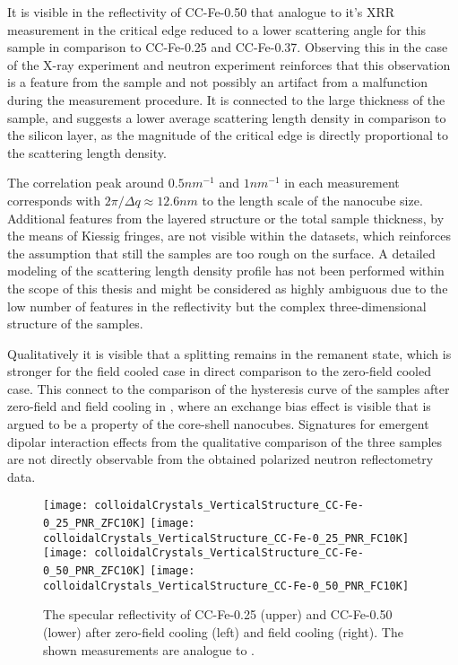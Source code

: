 \documentclass[\main/dresen_thesis.tex]{subfiles}
\begin{document}
  It is visible in the reflectivity of CC-Fe-0.50 that analogue to it's XRR measurement in  the critical edge reduced to a lower scattering angle for this sample in comparison to CC-Fe-0.25 and CC-Fe-0.37.
  Observing this in the case of the X-ray experiment and neutron experiment reinforces that this observation is a feature from the sample and not possibly an artifact from a malfunction during the measurement procedure.
  It is connected to the large thickness of the sample, and suggests a lower average scattering length density in comparison to the silicon layer, as the magnitude of the critical edge is directly proportional to the scattering length density.

  The correlation peak around $0.5 \unit{nm^{-1}}$ and $1 \unit{nm^{-1}}$ in each measurement corresponds with $2 \pi / \Delta q \approx 12.6 \unit{nm}$ to the length scale of the nanocube size.
  Additional features from the layered structure or the total sample thickness, by the means of Kiessig fringes, are not visible within the datasets, which reinforces the assumption that still the samples are too rough on the surface.
  A detailed modeling of the scattering length density profile has not been performed within the scope of this thesis and might be considered as highly ambiguous due to the low number of features in the reflectivity but the complex three-dimensional structure of the samples.

  Qualitatively it is visible that a splitting remains in the remanent state, which is stronger for the field cooled case in direct comparison to the zero-field cooled case.
  This connect to the comparison of the hysteresis curve of the samples after zero-field and field cooling in , where an exchange bias effect is visible that is argued to be a property of the core-shell nanocubes.
  Signatures for emergent dipolar interaction effects from the qualitative comparison of the three samples are not directly observable from the obtained polarized neutron reflectometry data.


  \begin{figure}[tb]
    \centering
    \texttt{[image: colloidalCrystals\_VerticalStructure\_CC-Fe-0\_25\_PNR\_ZFC10K]}
    \texttt{[image: colloidalCrystals\_VerticalStructure\_CC-Fe-0\_25\_PNR\_FC10K]}
    \texttt{[image: colloidalCrystals\_VerticalStructure\_CC-Fe-0\_50\_PNR\_ZFC10K]}
    \texttt{[image: colloidalCrystals\_VerticalStructure\_CC-Fe-0\_50\_PNR\_FC10K]}
    \caption{\label{fig:colloidalCrystals:pnrCCFe2550} The specular reflectivity of CC-Fe-0.25 (upper) and CC-Fe-0.50 (lower) after zero-field cooling (left) and field cooling (right). The shown measurements are analogue to .}
  \end{figure}
\end{document}
